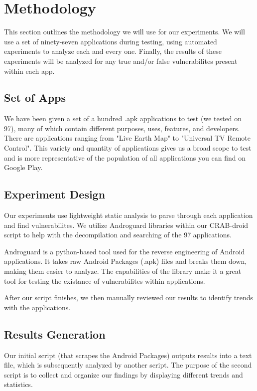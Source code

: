 \section{Methodology}
\label{sec:overview} 

This section outlines the methodology we will use for our experiments.
We will use a set of ninety-seven applications during testing, using
automated experiments to analyze each and every one. Finally, the results
of these experiments will be analyzed for any true and/or false vulnerabilites
present within each app.

\subsection{Set of Apps}

We have been given a set of a hundred .apk applications to test (we tested on 97), many of 
which contain different purposes, uses, features, and developers. There are 
applications ranging from "Live Earth Map" to "Universal TV Remote Control".
This variety and quantity of applications gives us a broad scope to test and is 
more representative of the population of all applications you can find on 
Google Play.

\subsection{Experiment Design}

Our experiments use lightweight static analysis to parse through each
application and find vulnerabilites. We utilize Androguard libraries within our
CRAB-droid script to help with the decompilation and searching of the 97 applications.

Androguard is a python-based tool used for the reverse engineering of
Android applications. It takes raw Android Packages (.apk) files and breaks
them down, making them easier to analyze. The capabilities of the library make it
a great tool for testing the existance of vulnerabilites within applications.

After our script finishes, we then manually reviewed our results to identify
trends with the applications.


\subsection{Results Generation}

Our initial script (that scrapes the Android Packages) outputs results into a text file, 
which is subsequently analyzed by another script. The purpose of the second script is to
collect and organize our findings by displaying different trends and statistics.

